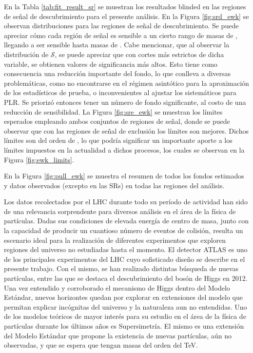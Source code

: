 En la Tabla \ref{tab:fit_result_sr} se muestran los resultados blinded en las regiones de señal de descubrimiento para el presente análisis. En la Figura \ref{fig:srd_ewk} se observan distribuciones para las regiones de señal de descubrimiento. Se puede apreciar cómo cada región de señal es sensible a un cierto rango de masas de \ninoone, llegando a ser sensible hasta masas de . Cabe mencionar, que al observar la distribución de $\mathcal{S}$, se puede apreciar que con cortes más estrictos de dicha variable, se obtienen valores de significancia más altos. Esto tiene como consecuencia una reducción importante del fondo, lo que conlleva a diversas problemáticas, como no encontrarse en el régimen asintótico para la aproximación de los estadísticos de prueba, o inconvenientes al ajustar los sistemáticos para PLR. Se priorizó entonces tener un número de fondo significante, al costo de una reducción de sensibilidad.
La Figura \ref{fig:sre_ewk} se muestran los límites esperados empleando ambos conjuntos de regiones de señal, donde se puede observar que con las regiones de señal de exclusión los límites son mejores.
Dichos límites son del orden de , lo que podría significar un importante aporte a los límites impuestos en la actualidad a dichos procesos, los cuales se observan en la Figura \ref{fig:ewk_limits}.

En la Figura \ref{fig:pull_ewk} se muestra el resumen de todos los fondos estimados y datos observados (excepto en las SRs) en todas las regiones del análisis.



Los datos recolectados por el LHC durante todo su período de actividad han sido de una relevancia sorprendente para diversos análisis en el área de la física de partículas. Dadas sus condiciones de elevada energía de centro de masa, junto con la capacidad de producir un cuantioso número de eventos de colisión, resulta un escenario ideal para la realización de diferentes experimentos que exploren regiones del universo no estudiadas hasta el momento. El detector ATLAS es uno de los principales experimentos del LHC cuyo sofisticado diseño se describe en el presente trabajo. Con el mismo, se han realizado distintas búsqueda de nuevas partículas, entre las que se destaca el descubrimiento del bosón de Higgs en 2012. Una vez entendido y corroborado el mecanismo de Higgs dentro del Modelo Estándar, nuevos horizontes quedan por explorar en extensiones del modelo que permitan explicar incógnitas del universo y la naturaleza aun no entendidas. Uno de los modelos teóricos de mayor interés para su estudio en el área de la física de partículas durante los últimos años es Supersimetría. El mismo es una extensión del Modelo Estándar que propone la existencia de nuevas partículas, aún no observadas, y que se espera que tengan masas del orden del TeV. 


